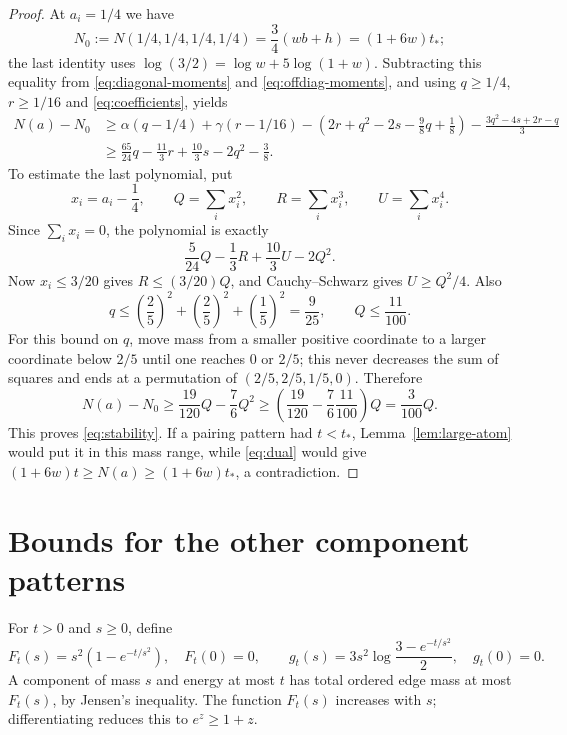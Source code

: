 \documentclass[11pt]{article}
\begin{document}
\begin{proof}
At $a_i=1/4$ we have
\begin{equation}\label{eq:uniform}
 N_0:=N(1/4,1/4,1/4,1/4)=\frac34(wb+h)=(1+6w)t_*;
\end{equation}
the last identity uses $\log(3/2)=\log w+5\log(1+w)$.
Subtracting this equality from \eqref{eq:diagonal-moments} and
\eqref{eq:offdiag-moments}, and using $q\ge1/4$, $r\ge1/16$ and
\eqref{eq:coefficients}, yields
\begin{align*}
 N(a)-N_0
 &\ge \alpha(q-1/4)+\gamma(r-1/16)
       -\left(2r+q^2-2s-\frac98q+\frac18\right)
       -\frac{3q^2-4s+2r-q}{3}\\
 &\ge \frac{65}{24}q-\frac{11}{3}r+\frac{10}{3}s-2q^2-\frac38.
\end{align*}
To estimate the last polynomial, put
\[
 x_i=a_i-\frac14,\qquad
 Q=\sum_i x_i^2,\qquad R=\sum_i x_i^3,\qquad U=\sum_i x_i^4.
\]
Since $\sum_i x_i=0$, the polynomial is exactly
\[
 \frac5{24}Q-\frac13R+\frac{10}{3}U-2Q^2.
\]
Now $x_i\le3/20$ gives $R\le(3/20)Q$, and Cauchy--Schwarz gives
$U\ge Q^2/4$. Also
\[
 q\le\left(\frac25\right)^2+\left(\frac25\right)^2
            +\left(\frac15\right)^2=\frac9{25},
 \qquad Q\le\frac{11}{100}.
\]
For this bound on $q$, move mass from a smaller positive coordinate to a
larger coordinate below $2/5$ until one reaches $0$ or $2/5$; this never
decreases the sum of squares and ends at a permutation of
$(2/5,2/5,1/5,0)$. Therefore
\[
 N(a)-N_0\ge\frac{19}{120}Q-\frac76Q^2
 \ge\left(\frac{19}{120}-\frac76\frac{11}{100}\right)Q
 =\frac3{100}Q.
\]
This proves \eqref{eq:stability}. If a pairing pattern had $t<t_*$,
Lemma~\ref{lem:large-atom} would put it in this mass range, while
\eqref{eq:dual} would give
$(1+6w)t\ge N(a)\ge(1+6w)t_*$, a contradiction.
\end{proof}

\section{Bounds for the other component patterns}

For $t>0$ and $s\ge0$, define
\[
 F_t(s)=s^2(1-e^{-t/s^2}),\quad F_t(0)=0,
 \qquad
 g_t(s)=3s^2\log\frac{3-e^{-t/s^2}}2,\quad g_t(0)=0.
\]
A component of mass $s$ and energy at most $t$ has total ordered edge mass
at most $F_t(s)$, by Jensen's inequality. The function $F_t(s)$ increases
with $s$; differentiating reduces this to $e^z\ge1+z$.
\end{document}
